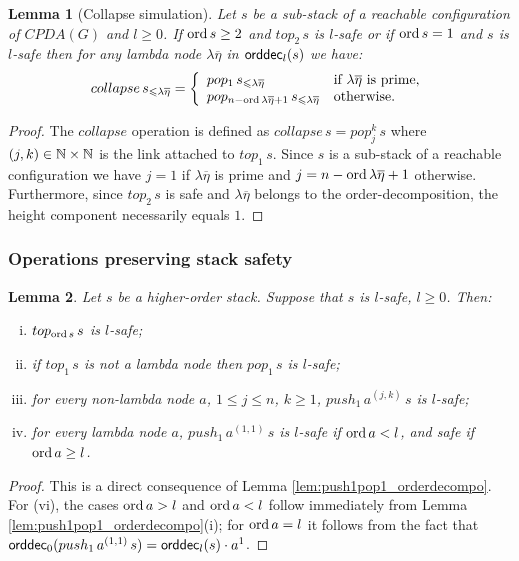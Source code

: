 \documentclass[a4paper]{article}[12pt]
\newtheorem{lemma}{Lemma}[section]
\theoremstyle{remark}
\theoremstyle{definition}
\newcommand\orddec{{\sf orddec}}
\begin{document}
\begin{lemma}[Collapse simulation]
\label{lem:safecollapsesimulation}
Let $s$ be a sub-stack of a reachable configuration of $CPDA(G)$ and $l\geq 0$.
If $\mathop{\mathrm{ord}} s \geq 2$ and $top_2\,s$ is $l$-safe or if $\mathop{\mathrm{ord}} s = 1$ and $s$ is $l$-safe then for any lambda node $\lambda\overline\eta$ in $\orddec_l(s)$ we have:
$$collapse\,s_{\leqslant\lambda\overline\eta} =
\left\{
\begin{array}{ll}
pop_1\,s_{\leqslant\lambda\overline\eta} & \mbox{if $\lambda\overline\eta$ is prime,}\\
pop_{n-\mathop{\mathrm{ord}} \lambda\overline\eta +1}\,s_{\leqslant\lambda\overline\eta} & \mbox{otherwise.}
\end{array}
\right.
$$
\end{lemma}
\begin{proof}
The $collapse$ operation is defined as  $collapse\,s = pop_j^k\,s$ where $(j,k)\in\mathbb{N}\times\mathbb{N}$ is the link attached to $top_1\,s$.
Since $s$ is a sub-stack of a reachable configuration we have $j=1$ if $\lambda\overline\eta$ is prime and $j = n-\mathop{\mathrm{ord}} \lambda\overline\eta +1$ otherwise. Furthermore, since $top_2\,s$ is safe and $\lambda\overline\eta$ belongs to the order-decomposition, the height component necessarily equals $1$.
\end{proof}

\subsubsection{Operations preserving stack safety}
\begin{lemma}
\label{lem:push1pop1_preserves_safety} Let $s$ be a higher-order
stack. Suppose that $s$ is $l$-safe, $l\geq0$. Then:
    \begin{enumerate}[(i)]
    \item $top_{\mathop{\mathrm{ord}}{s}}\,s$ is $l$-safe;
    \item if $top_1\,s$ is not a lambda node then $pop_1\,s$ is $l$-safe;
    \item for every non-lambda node $a$, $1\leq j\leq n$, $k\geq 1$, $push_1\,a^{(j,k)}\,s$ is $l$-safe;
    \item for every lambda node $a$, $push_1\,a^{(1,1)}\,s$ is $l$-safe if $\mathop{\mathrm{ord}} a < l$, and safe if $\mathop{\mathrm{ord}} a \geq l$.
\end{enumerate}
\end{lemma}
\begin{proof}
This is a direct consequence of Lemma \ref{lem:push1pop1_orderdecompo}.
For (vi), the cases $\mathop{\mathrm{ord}} a > l$ and $\mathop{\mathrm{ord}} a < l$ follow immediately from Lemma \ref{lem:push1pop1_orderdecompo}(i);
for $\mathop{\mathrm{ord}} a = l$ it follows from the fact that $\orddec_0 (push_1\,a^{(1,1)}\,s) = \orddec_l (s) \cdot a^1$.
\end{proof}
\end{document}

